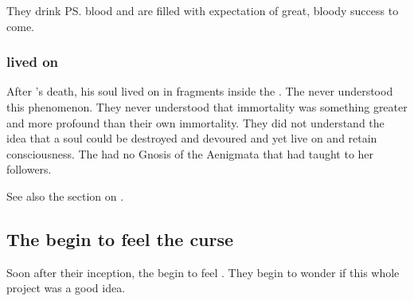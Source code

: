 They drink \ps{\Nexagglachel}{} blood and are filled with expectation of great, bloody success to come. 






\subsubsection{\Nexagglachel lived on}
After \Nexagglachel's death, his soul lived on in fragments inside the \satharioth.
The \resphain never understood this phenomenon. 
They never understood that \draconian immortality was something greater and more profound than their own immortality.
They did not understand the idea that a soul could be destroyed and devoured and yet live on and retain consciousness. 
The \resphain had no Gnosis of the Aenigmata that \KhothSell had taught to her followers.

See also the section on . 









\subsection{The \satharioth begin to feel the curse}
Soon after their inception, the \satharioth{} begin to feel . 
They begin to wonder if this whole project was a good idea.

